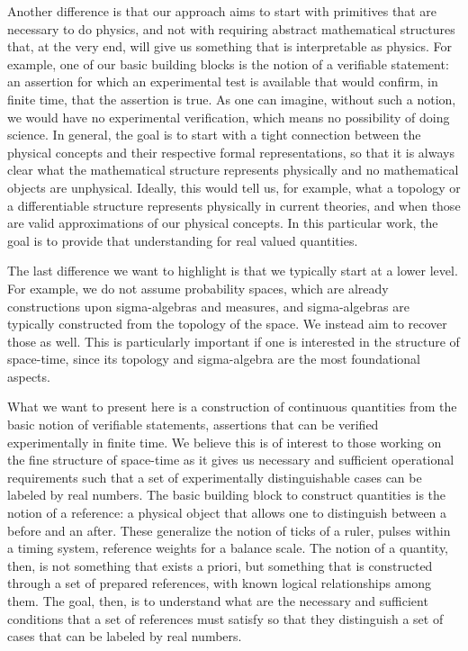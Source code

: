 \documentclass{article}
\begin{document}
Another difference is that our approach aims to start with primitives that are necessary to do physics, and not with requiring abstract mathematical structures that, at the very end, will give us something that is interpretable as physics. For example, one of our basic building blocks is the notion of a verifiable statement\cite{Carc2}: an assertion for which an experimental test is available that would confirm, in finite time, that the assertion is true. As one can imagine, without such a notion, we would have no experimental verification, which means no possibility of doing science. In general, the goal is to start with a tight connection between the physical concepts and their respective formal representations, so that it is always clear what the mathematical structure represents physically and no mathematical objects are unphysical. Ideally, this would tell us, for example, what a topology or a differentiable structure represents physically in current theories, and when those are valid approximations of our physical concepts. In this particular work, the goal is to provide that understanding for real valued quantities.

The last difference we want to highlight is that we typically start at a lower level. For example, we do not assume probability spaces, which are already constructions upon sigma-algebras and measures, and sigma-algebras are typically constructed from the topology of the space. We instead aim to recover those as well. This is particularly important if one is interested in the structure of space-time, since its topology and sigma-algebra are the most foundational aspects.

What we want to present here is a construction of continuous quantities from the basic notion of verifiable statements, assertions that can be verified experimentally in finite time. We believe this is of interest to those working on the fine structure of space-time as it gives us necessary and sufficient operational requirements such that a set of experimentally distinguishable cases can be labeled by real numbers. The basic building block to construct quantities is the notion of a reference: a physical object that allows one to distinguish between a before and an after. These generalize the notion of ticks of a ruler, pulses within a timing system, reference weights for a balance scale. The notion of a quantity, then, is not something that exists a priori, but something that is constructed through a set of prepared references, with known logical relationships among them. The goal, then, is to understand what are the necessary and sufficient conditions that a set of references must satisfy so that they distinguish a set of cases that can be labeled by real numbers.
\end{document}
